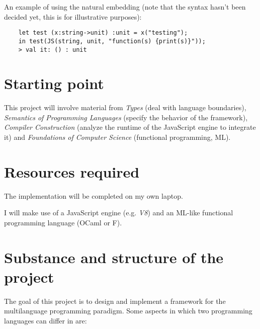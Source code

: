 \documentclass[12pt,a4paper]{article} \usepackage{a4wide}
\newcommand{\fs}{F\nolinebreak\hspace{-.05em}\raisebox{.6ex}{\tiny\bf
    \#}}
\begin{document}
An example of using the natural embedding (note that the syntax hasn't
been decided yet, this is for illustrative purposes):

\begin{verbatim}
    let test (x:string->unit) :unit = x("testing");
    in test(JS(string, unit, "function(s) {print(s)}"));
    > val it: () : unit
\end{verbatim}


\section{Starting point}

This project will involve material from \emph{Types} (deal with
language boundaries), \emph{Semantics of Programming Languages}
(specify the behavior of the framework), \emph{Compiler Construction}
(analyze the runtime of the JavaScript engine to integrate it) and
\emph{Foundations of Computer Science} (functional programming, ML).


\section{Resources required}

The implementation will be completed on my own laptop.

I will make use of a JavaScript engine (e.g. \emph{V8}) and an ML-like
functional programming language (OCaml or \fs).


\section{Substance and structure of the project}

The goal of this project is to design and implement a framework for the multilanguage programming paradigm. Some aspects in which two programming languages can differ in are:
\end{document}
